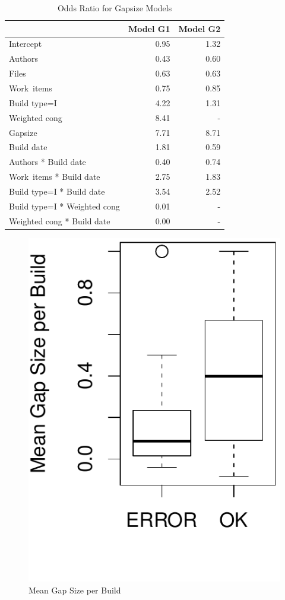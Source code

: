 \begin{table}[t]
\begin{center}
\begin{tabular}{l|rr}
  \hline
 & Model G1 & Model G2 \\ 
  \hline
Intercept & 0.95 & 1.32 \\ 
  Authors & 0.43 & 0.60 \\ 
  Files & 0.63 & 0.63 \\ 
  Work~items & 0.75 & 0.85 \\ 
  Build type=I & 4.22 & 1.31 \\ 
  Weighted cong & 8.41 & - \\ 
  Gapsize & 7.71 & 8.71 \\ 
  Build date & 1.81 & 0.59 \\ 
  Authors * Build date & 0.40 & 0.74 \\ 
  Work~items * Build date & 2.75 & 1.83 \\ 
  Build type=I * Build date & 3.54 & 2.52 \\ 
  Build type=I * Weighted cong & 0.01 & - \\ 
  Weighted cong * Build date & 0.00 & - \\ 
   \hline
\end{tabular}
\caption{Odds Ratio for Gapsize Models}
\label{tab:oddsratio_gapsize}
\end{center}
\end{table}


\begin{figure}[t]
	\centering	
	\includegraphics[width=.5\columnwidth]{figures/boxplot_meangapsize}
	\caption{Mean Gap Size per Build}
	\label{fig:gapsizes}
\end{figure}

